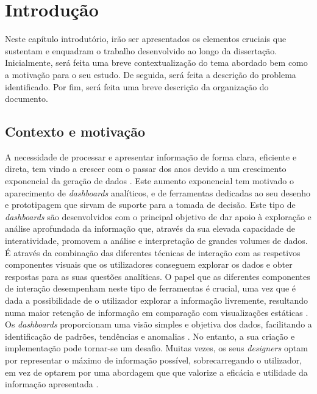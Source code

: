 
%

\chapter{Introdução}
\label{cha:introducao}

Neste capítulo introdutório, irão ser apresentados os elementos cruciais que sustentam e enquadram o trabalho desenvolvido ao longo da dissertação. Inicialmente, será feita uma breve contextualização do tema abordado bem como a motivação para o seu estudo. De seguida, será feita a descrição do problema identificado. Por fim, será feita uma breve descrição da organização do documento.

\section{Contexto e motivação}
\label{sec:cont_e_motiv}

A necessidade de processar e apresentar informação de forma clara, eficiente e direta, tem vindo a crescer com o passar dos anos devido a um crescimento exponencial da geração de dados \cite{kitchin2014data}. Este aumento exponencial tem motivado o aparecimento de \textit{dashboards} analíticos, e de ferramentas dedicadas ao seu desenho e prototipagem que sirvam de suporte para a tomada de decisão. Este tipo de \textit{dashboards} são desenvolvidos com o principal objetivo de dar apoio à exploração e análise aprofundada da informação que, através da sua elevada capacidade de interatividade, promovem a análise e interpretação de grandes volumes de dados. É através da combinação das diferentes técnicas de interação com as respetivos componentes visuais que os utilizadores conseguem explorar os dados e obter respostas para as suas questões analíticas. O papel que as diferentes componentes de interação desempenham neste tipo de ferramentas é crucial, uma vez que é dada a possibilidade de o utilizador explorar a informação livremente, resultando numa maior retenção de informação em comparação com visualizações estáticas \cite{brucker2014learning}. Os \textit{dashboards} proporcionam uma visão simples e objetiva dos dados, facilitando a identificação de padrões, tendências e anomalias \cite{few2006information}. No entanto, a sua criação e implementação pode tornar-se um desafio. Muitas vezes, os seus \textit{designers} optam por representar o máximo de informação possível, sobrecarregando o utilizador, em vez de optarem por uma abordagem que que valorize a eficácia e utilidade da informação apresentada \cite{eckerson2010performance}.

